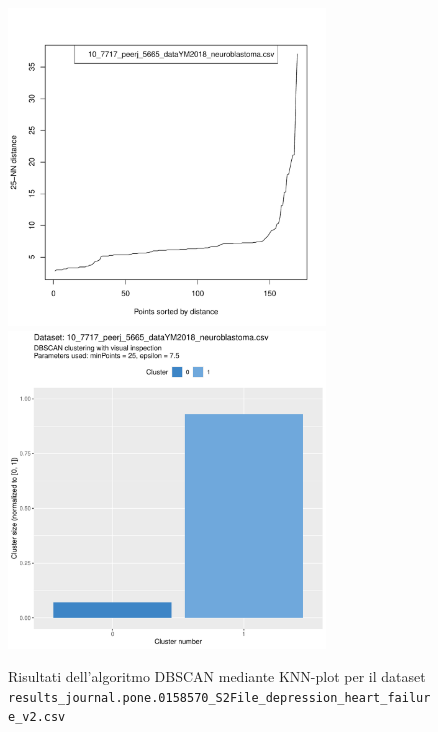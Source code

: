 \documentclass[12pt]{report}
\begin{document}
			\begin{figure}[h]
				\centering
				\includegraphics[width = 0.75\textwidth, height = 0.45\textheight, page = 1]{
					doc/DBSCAN_optimal_MinPts.pdf
				}
				\includegraphics[width = 0.75\textwidth, height = 0.45\textheight, page = 1]{
					results/DBSCAN_visual_comparison.pdf
				}
				\caption{Risultati dell'algoritmo DBSCAN mediante KNN-plot per il dataset
				\texttt{results\_journal.pone.0158570\_S2File\_depression\_heart\_failure\_v2.csv}}
				\label{fig:dbscan-extra1}
			\end{figure}
\end{document}
